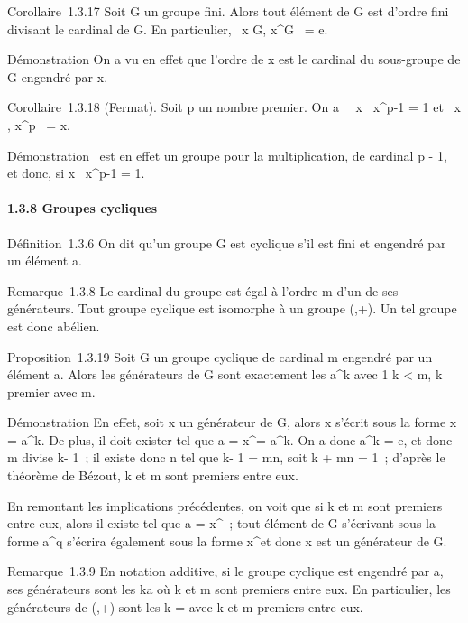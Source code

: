 Corollaire~1.3.17 Soit G un groupe fini. Alors tout élément de G est
d'ordre fini divisant le cardinal de G. En particulier,
\forall~x \in G, x^G~ =
e.

Démonstration On a vu en effet que l'ordre de x est le cardinal du
sous-groupe de G engendré par x.

Corollaire~1.3.18 (Fermat). Soit p un nombre premier. On a
\forall~~x \in {}\diagupp{}
\diagdown\0\, x^p-1 = 1 et
\forall~x \in {}\diagupp{}, x^p~ = x.

Démonstration \diagupp{} \diagdown\0\ est en effet
un groupe pour la multiplication, de cardinal p - 1, et donc, si x \in
{}\diagupp{} \diagdown\0\, x^p-1 = 1.

\paragraph{1.3.8 Groupes cycliques}

Définition~1.3.6 On dit qu'un groupe G est cyclique s'il est fini et
engendré par un élément a.

Remarque~1.3.8 Le cardinal du groupe est égal à l'ordre m d'un de ses
générateurs. Tout groupe cyclique est isomorphe à un groupe (\diagupm{},+). Un
tel groupe est donc abélien.

Proposition~1.3.19 Soit G un groupe cyclique de cardinal m engendré par
un élément a. Alors les générateurs de G sont exactement les
a^k avec 1 \leq k < m, k premier avec m.

Démonstration En effet, soit x un générateur de G, alors x s'écrit sous
la forme x = a^k. De plus, il doit exister \ell tel que a =
x^\ell = a^k\ell. On a donc a^k = e, et
donc m divise k\ell - 1~; il existe donc n \in {} tel que k\ell - 1 = mn, soit k\ell
+ mn = 1~; d'après le théorème de Bézout, k et m sont premiers entre
eux.

En remontant les implications précédentes, on voit que si k et m sont
premiers entre eux, alors il existe \ell tel que a = x^\ell~; tout
élément de G s'écrivant sous la forme a^q s'écrira également
sous la forme x^\ellq et donc x est un générateur de G.

Remarque~1.3.9 En notation additive, si le groupe cyclique est engendré
par a, ses générateurs sont les ka où k et m sont premiers entre eux. En
particulier, les générateurs de (\diagupm{},+) sont les
k = \overlinek avec k et
m premiers entre eux.

